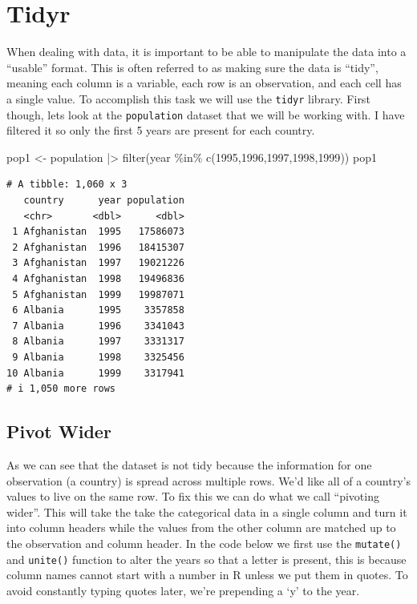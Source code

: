 \documentclass[
  letterpaper,
  DIV=11,
  numbers=noendperiod]{scrreprt}
\newenvironment{Shaded}{\begin{snugshade}}{\end{snugshade}}
\newcommand{\DecValTok}[1]{\textcolor[rgb]{0.68,0.00,0.00}{#1}}
\newcommand{\FunctionTok}[1]{\textcolor[rgb]{0.28,0.35,0.67}{#1}}
\newcommand{\NormalTok}[1]{\textcolor[rgb]{0.00,0.23,0.31}{#1}}
\newcommand{\OtherTok}[1]{\textcolor[rgb]{0.00,0.23,0.31}{#1}}
\newcommand{\SpecialCharTok}[1]{\textcolor[rgb]{0.37,0.37,0.37}{#1}}
\begin{document}
\section{Tidyr}\label{tidyr}

When dealing with data, it is important to be able to manipulate the
data into a ``usable'' format. This is often referred to as making sure
the data is ``tidy'', meaning each column is a variable, each row is an
observation, and each cell has a single value. To accomplish this task
we will use the \texttt{tidyr} library. First though, lets look at the
\texttt{population} dataset that we will be working with. I have
filtered it so only the first 5 years are present for each country.

\begin{Shaded}
\begin{Highlighting}[]
\NormalTok{pop1 }\OtherTok{\textless{}{-}}\NormalTok{ population }\SpecialCharTok{|\textgreater{}} \FunctionTok{filter}\NormalTok{(year }\SpecialCharTok{\%in\%} \FunctionTok{c}\NormalTok{(}\DecValTok{1995}\NormalTok{,}\DecValTok{1996}\NormalTok{,}\DecValTok{1997}\NormalTok{,}\DecValTok{1998}\NormalTok{,}\DecValTok{1999}\NormalTok{))}
\NormalTok{pop1}
\end{Highlighting}
\end{Shaded}

\begin{verbatim}
# A tibble: 1,060 x 3
   country      year population
   <chr>       <dbl>      <dbl>
 1 Afghanistan  1995   17586073
 2 Afghanistan  1996   18415307
 3 Afghanistan  1997   19021226
 4 Afghanistan  1998   19496836
 5 Afghanistan  1999   19987071
 6 Albania      1995    3357858
 7 Albania      1996    3341043
 8 Albania      1997    3331317
 9 Albania      1998    3325456
10 Albania      1999    3317941
# i 1,050 more rows
\end{verbatim}

\subsection{Pivot Wider}\label{pivot-wider}

As we can see that the dataset is not tidy because the information for
one observation (a country) is spread across multiple rows. We'd like
all of a country's values to live on the same row. To fix this we can do
what we call ``pivoting wider''. This will take the take the categorical
data in a single column and turn it into column headers while the values
from the other column are matched up to the observation and column
header. In the code below we first use the \texttt{mutate()} and
\texttt{unite()} function to alter the years so that a letter is
present, this is because column names cannot start with a number in R
unless we put them in quotes. To avoid constantly typing quotes later,
we're prepending a `y' to the year.
\end{document}

